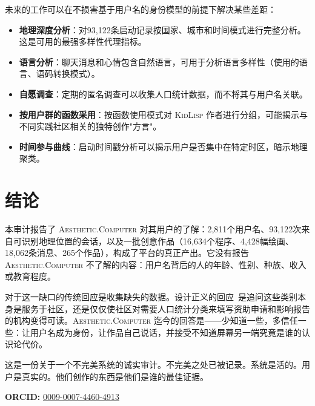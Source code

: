 \documentclass[10pt,letterpaper,twocolumn]{article}
\newcommand{\ac}{\textsc{Aesthetic.Computer}}
\newcommand{\kl}{\textsc{KidLisp}}
\begin{document}
未来的工作可以在不损害基于用户名的身份模型的前提下解决某些差距：

\begin{itemize}
  \item \textbf{地理深度分析}：对93,122条启动记录按国家、城市和时间模式进行完整分析。这是可用的最强多样性代理指标。
  \item \textbf{语言分析}：聊天消息和心情包含自然语言，可用于分析语言多样性（使用的语言、语码转换模式）。
  \item \textbf{自愿调查}：定期的匿名调查可以收集人口统计数据，而不将其与用户名关联。
  \item \textbf{按用户群的函数采用}：按函数使用模式对 \kl{} 作者进行分组，可能揭示与不同实践社区相关的独特创作"方言"。
  \item \textbf{时间参与曲线}：启动时间戳分析可以揭示用户是否集中在特定时区，暗示地理聚类。
\end{itemize}

\section{结论}

本审计报告了 \ac{} 对其用户的了解：2,811个用户名、93,122次来自可识别地理位置的会话，以及一批创意作品（16,634个程序、4,428幅绘画、18,062条消息、265个作品），构成了平台的真正产出。它没有报告 \ac{} 不了解的内容：用户名背后的人的年龄、性别、种族、收入或教育程度。

对于这一缺口的传统回应是收集缺失的数据。设计正义的回应~\citep{costanzachock2020design}是追问这些类别本身是服务于社区，还是仅仅使社区对需要人口统计分类来填写资助申请和影响报告的机构变得可读。\ac{} 迄今的回答是——少知道一些，多信任一些：让用户名成为身份，让作品自己说话，并接受不知道屏幕另一端究竟是谁的认识论代价。

这是一份关于一个不完美系统的诚实审计。不完美之处已被记录。系统是活的。用户是真实的。他们创作的东西是他们是谁的最佳证据。

\vspace{0.5em}
\noindent\textbf{ORCID:} \href{https://orcid.org/0009-0007-4460-4913}{0009-0007-4460-4913}



\end{document}
